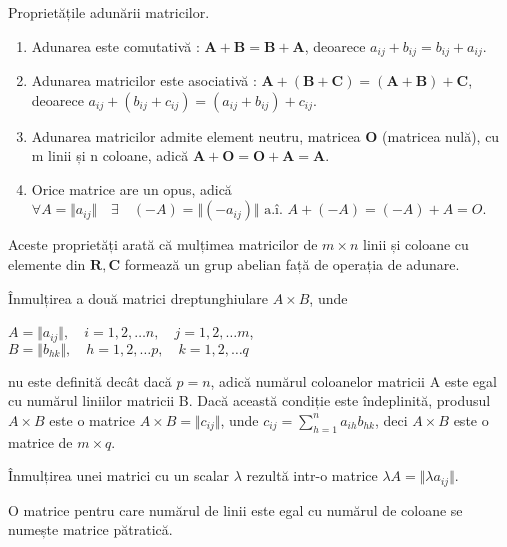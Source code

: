 Proprietățile adunării matricilor.
\begin{enumerate}
  \item Adunarea este comutativă : $\mathbf{A + B = B + A}$, deoarece
  $\mathit{a_{ij} + b_{ij} = b_{ij} + a_{ij}}$.
  \item Adunarea matricilor este asociativă : $\mathbf{A + (B + C) = (A + B) +
  C}$, deoarece $\mathit{a_{ij} + (b_{ij} + c_{ij}) = (a_{ij} + b_{ij}) +
  c_{ij}}$.
  \item Adunarea matricilor admite element neutru, matricea \textbf{O}
  (matricea nulă), cu m linii și n coloane, adică $\mathbf{A + O = O + A = A}$.
  \item Orice matrice are un opus, adică $\forall A = \Vert a_{ij} \Vert \quad
   \exists \quad (-A) = \Vert (-a_{ij}) \Vert \text{ a.î. }
   A + (-A) = (-A) + A = O$.
\end{enumerate}
Aceste proprietăți arată că mulțimea matricilor de $m \times n$ linii și
coloane cu elemente din $\mathbf{R, C}$ formează un grup abelian față de
operația de adunare.

Înmulțirea a două matrici dreptunghiulare $A \times B$, unde
\begin{center}
$A = \Vert a_{ij} \Vert, \quad i = 1, 2, \dots n, \quad j = 1, 2, \dots m$, \\
$B = \Vert b_{hk} \Vert, \quad h = 1, 2, \dots p, \quad k = 1, 2, \dots q$
\end{center}
nu este definită decât dacă $p = n$, adică numărul coloanelor matricii A este
egal cu numărul liniilor matricii B. Dacă această condiție este îndeplinită, produsul
$A \times B$ este o matrice $A \times B = \Vert c_{ij} \Vert$, unde $c_{ij} =
\sum_{h = 1}^{n}a_{ih}b_{hk}$, deci $A \times B$ este o matrice de $m \times q$.

Înmulțirea unei matrici cu un scalar $\lambda$ rezultă intr-o matrice $\lambda A
= \Vert \lambda a_{ij} \Vert$.

O matrice pentru care numărul de linii este egal cu numărul de coloane se
numește matrice pătratică.

